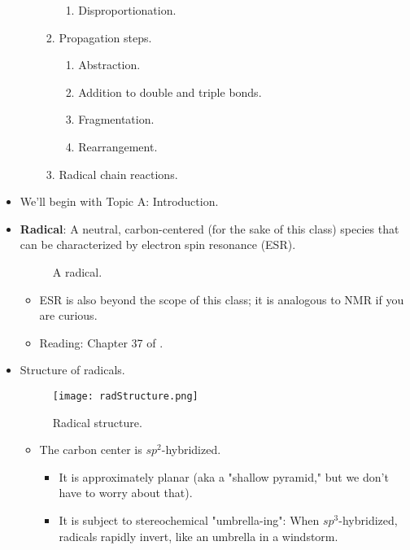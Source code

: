 \documentclass[../notes.tex]{subfiles}
\begin{document}
\begin{itemize}
\begin{enumerate}[label={\Alph*.}]
\begin{enumerate}[label={\arabic*)}]
\begin{enumerate}[label={\alph*)}]
                \item Disproportionation.
            \end{enumerate}
            \item Propagation steps.
            \begin{enumerate}[label={\alph*)}]
                \item Abstraction.
                \item Addition to double and triple bonds.
                \item Fragmentation.
                \item Rearrangement.
            \end{enumerate}
            \item Radical chain reactions.
        \end{enumerate}
    \end{enumerate}
    \pagebreak
    \item We'll begin with Topic A: Introduction.
    \item \textbf{Radical}: A neutral, carbon-centered (for the sake of this class) species that can be characterized by electron spin resonance (ESR).
    \begin{figure}[h!]
        \centering
        \footnotesize
        \caption{A radical.}
        \label{fig:rad}
    \end{figure}
    \begin{itemize}
        \item ESR is also beyond the scope of this class; it is analogous to NMR if you are curious.
        \item Reading: Chapter 37 of \textcite{bib:Clayden}.
    \end{itemize}
    \item Structure of radicals.
    \begin{figure}[h!]
        \centering
        \texttt{[image: radStructure.png]}
        \caption{Radical structure.}
        \label{fig:radStructure}
    \end{figure}
    \begin{itemize}
        \item The carbon center is $sp^2$-hybridized.
        \begin{itemize}
            \item It is approximately planar (aka a "shallow pyramid," but we don't have to worry about that).
            \item It is subject to stereochemical "umbrella-ing": When $sp^3$-hybridized, radicals rapidly invert, like an umbrella in a windstorm.

\end{itemize}
\end{itemize}
\end{itemize}
\end{document}
